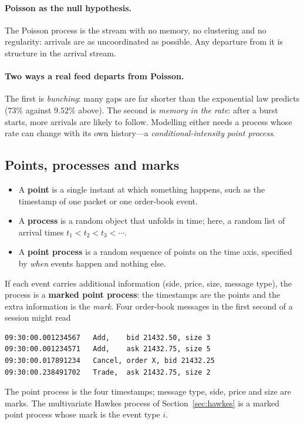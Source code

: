 \paragraph{Poisson as the null hypothesis.} The Poisson process is the stream with no memory, no
clustering and no regularity: arrivals are as uncoordinated as possible. Any departure from it is
structure in the arrival stream.

\paragraph{Two ways a real feed departs from Poisson.} The first is \emph{bunching}: many gaps are
far shorter than the exponential law predicts ($73\%$ against $9.52\%$ above). The second is
\emph{memory in the rate}: after a burst starts, more arrivals are likely to follow. Modelling either
needs a process whose rate can change with its own history---a \emph{conditional-intensity point
process}.

\subsection{Points, processes and marks}
\label{app:pp-points}

\begin{itemize}[leftmargin=1.5em,itemsep=1pt]
\item A \textbf{point} is a single instant at which something happens, such as the timestamp of one
  packet or one order-book event.
\item A \textbf{process} is a random object that unfolds in time; here, a random list of arrival
  times $t_1 < t_2 < t_3 < \cdots$.
\item A \textbf{point process} is a random sequence of points on the time axis, specified by
  \emph{when} events happen and nothing else.
\end{itemize}
If each event carries additional information (side, price, size, message type), the process is a
\textbf{marked point process}: the timestamps are the points and the extra information is the
\emph{mark}. Four order-book messages in the first second of a session might read
\begin{verbatim}
09:30:00.001234567   Add,    bid 21432.50, size 3
09:30:00.001234571   Add,    ask 21432.75, size 5
09:30:00.017891234   Cancel, order X, bid 21432.25
09:30:00.238491702   Trade,  ask 21432.75, size 2
\end{verbatim}
The point process is the four timestamps; message type, side, price and size are marks. The
multivariate Hawkes process of Section~\ref{sec:hawkes} is a marked point process whose mark is the
event type $i$.


